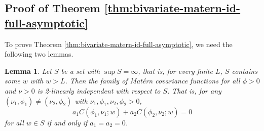 \documentclass[11pt]{article}
\newtheorem{lemma}{Lemma}
\theoremstyle{definition}
\theoremstyle{remark}
\begin{document}
\subsection{Proof of Theorem \ref{thm:bivariate-matern-id-full-asymptotic}}

To prove Theorem \ref{thm:bivariate-matern-id-full-asymptotic}, we need the following two lemmas.  




\begin{lemma}\label{lem:matern-asymptotic-2-linind-two-parameter}
Let $S$ be a set with $\sup S = \infty$, that is, for every finite $L$, $S$ contains some $w$ with $w>L$. Then the family of Mat\'ern covariance functions for all $\phi>0$ and $\nu >0$ is 2-linearly independent with respect to $S$. That is, for any $(\nu_1, \phi_1) \neq (\nu_2, \phi_2)$ with $\nu_1, \phi_1,\nu_2, \phi_2 > 0$, 
\begin{equation}\label{eq:matern-2-linind-asymptotic-1} 
a_1 C(\phi_1, \nu_1; w) + a_2 C(\phi_2, \nu_2; w)=0
\end{equation} 
for all $w\in S$ if and only if $a_1=a_2=0$.
\end{lemma}
\end{document}
